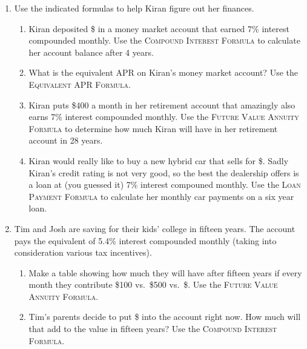 \begin{enumerate}
\item Use the indicated formulas to help Kiran figure out her finances.
\begin{enumerate}
\item Kiran deposited \$ in a money market account that earned 7\% interest compounded monthly.  Use the \textsc{Compound Interest Formula} to calculate her account balance after 4 years. \vfill
\item What is the equivalent APR on Kiran's money market account?  Use the \textsc{Equivalent APR Formula.} \vfill
\item Kiran puts \$400 a month in her retirement account that amazingly also earns 7\% interest compounded monthly.  Use the \textsc{Future Value Annuity Formula} to determine how much Kiran will have in her retirement account in 28 years. \vfill
\item Kiran would really like to buy a new hybrid car that sells for \$.  Sadly Kiran's credit rating is not very good, so the best the dealership offers is a loan at (you guessed it) 7\% interest compouned monthly.  Use the \textsc{Loan Payment Formula} to calculate her monthly car payments on a six year loan. \vfill
\end{enumerate}

\newpage %

\item Tim and Josh are saving for their kids' college in fifteen years. The account pays the equivalent of 5.4\% interest compounded monthly (taking into consideration various tax incentives). 
 \begin{enumerate}
\item Make a table showing how much they will have after fifteen years if every month they contribute  \$100 vs.\ \$500 vs.\ \$. Use the \textsc{Future Value Annuity Formula}. \vfill  \vfill
\item Tim's parents decide to put \$ into the account right now.  How much will that add to the value in fifteen years?  Use the \textsc{Compound Interest Formula}.  \vfill  \vfill
\end{enumerate}


\end{enumerate}
